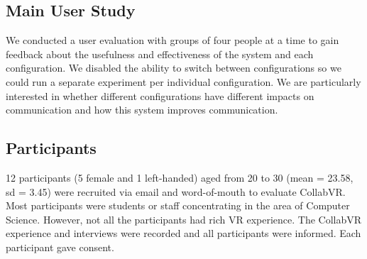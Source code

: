 \documentclass[chi_draft]{sigchi}
\begin{document}
\subsection{Main User Study}
We conducted a user evaluation with groups of four people at a time to gain feedback about the usefulness and effectiveness of the system and each configuration. We disabled the ability to switch between configurations so we could run a separate experiment per individual configuration. We are particularly interested in whether different configurations have different impacts on communication and how this system improves communication.

\subsection{Participants}
12 participants (5 female and 1 left-handed) aged from 20 to 30 (mean = 23.58, sd = 3.45) were recruited via email and word-of-mouth to evaluate CollabVR. Most participants were students or staff concentrating in the area of Computer Science. However, not all the participants had rich VR experience. The CollabVR experience and interviews were recorded and all participants were informed. Each participant gave consent.
\end{document}
